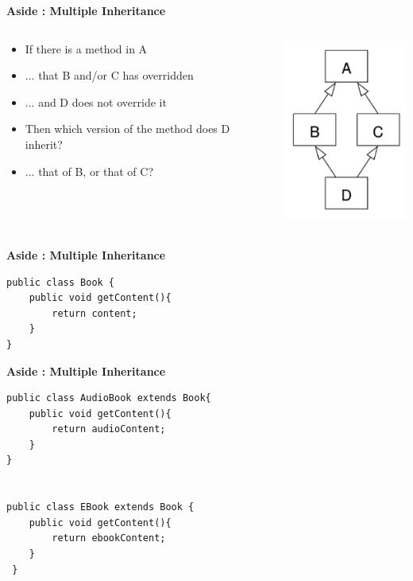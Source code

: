 \documentclass{beamer}
\begin{document}
\begin{frame}
\begin{center}
\textbf{Aside : Multiple Inheritance}
\end{center}
\begin{columns}
\begin{column}{0.6\textwidth}
\begin{itemize}
\item If there is a method in A 
\item ... that B and/or C has overridden
\item ... and D does not override it
\bigskip
\item Then which version of the method does D inherit? 
\item ... that of B, or that of C?
\end{itemize}
\end{column}
\begin{column}{0.4\textwidth}
\includegraphics[height=6cm, keepaspectratio]{images/diamond}
\end{column}
\end{columns}
\end{frame}

\begin{frame}[fragile]
\begin{center}
\textbf{Aside : Multiple Inheritance}
\end{center}
\begin{block}{}
\begin{lstlisting}
public class Book {
    public void getContent(){
        return content;
    }
}
\end{lstlisting}
\end{block}
\end{frame}

\begin{frame}[fragile]
\begin{center}
\textbf{Aside : Multiple Inheritance}
\end{center}
\begin{block}{}
\begin{lstlisting}
public class AudioBook extends Book{
    public void getContent(){
        return audioContent;
    }
}


public class EBook extends Book { 
    public void getContent(){
        return ebookContent;
    }
 }
\end{lstlisting}
\end{block}
\end{frame}
\end{document}
